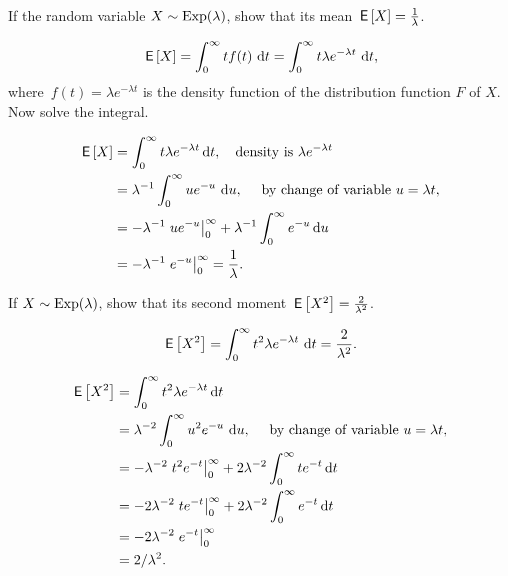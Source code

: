 \documentclass[companion]{subfiles}
\begin{document}
\begin{exercise}
 If the random variable $X\sim\operatorname{Exp}(\lambda)$, show that its mean $\,\mathsf{E}\left[X\right] = \frac{1}\lambda$. 
\begin{hint}
 \begin{equation*}
 \,\mathsf{E}\left[X\right] = \int_0^\infty t f(t)\, \,\text{d}t =
 \int_0^\infty t \lambda e^{-\lambda t}\, \,\text{d}t,
 \end{equation*}
 where~$f(t)=\lambda e^{-\lambda t}$ is the density function of the distribution function $F$ of $X$. Now solve the integral.
\end{hint}
\begin{solution}
 \begin{align*}
\,\mathsf{E}\left[X\right] 
&= \int_0^\infty t \lambda e^{-\lambda t} \,\text{d}t, \quad\text{density is } \lambda e^{-\lambda t} \\
&= \lambda^{-1} \int_0^\infty u e^{-u}\, \,\text{d}u, \quad \text{ by change of variable $u=\lambda t$}, \\
&= -\lambda^{-1}\left. u e^{- u}\right|_0^\infty + \lambda^{-1} \int_0^\infty e^{- u} \,\text{d}u\\
&= - \lambda^{-1} \left. e^{- u} \right|_0^\infty = \frac1\lambda.
 \end{align*}
\end{solution}
\end{exercise}

\begin{exercise} 
 If $X\sim\operatorname{Exp}(\lambda)$, show that its second moment $\,\mathsf{E}\left[X^2\right] = \frac{2}{\lambda^2}$.
\begin{hint}
 \begin{equation*}
 \,\mathsf{E}\left[X^2\right]= \int_0^\infty t^2 \lambda e^{-\lambda t}\, \,\text{d}t = \frac{2}{\lambda^2}.
 \end{equation*}
\end{hint}
\begin{solution}
 \begin{align*}
\,\mathsf{E}\left[X^2\right] 
&= \int_0^\infty t^2 \lambda e^{-\lambda t} \,\text{d}t \\
&= \lambda^{-2} \int_0^\infty u^2 e^{-u}\, \,\text{d}u, \quad \text{ by change of variable $u=\lambda t$}, \\
&= -\lambda^{-2}\left. t^2 e^{- t}\right|_0^\infty + 2\lambda^{-2}\int_0^\infty t e^{- t} \,\text{d}t \\
&= -2\lambda^{-2}\left. t e^{- t}\right|_0^\infty + 2\lambda^{-2} \int_0^\infty e^{- t} \,\text{d}t\\
&= - 2\lambda^{-2} \left. e^{- t} \right|_0^\infty \\
&= 2/\lambda^2.
 \end{align*}
\end{solution}
\end{exercise}
\end{document}
